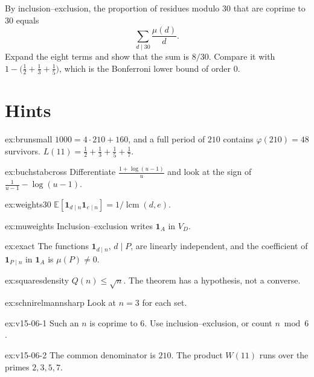 \begin{exercise}[$\star$]\label{ex:v15-06-4}
By inclusion--exclusion, the proportion of residues modulo \(30\) that are coprime to \(30\) equals
\[
\sum_{d\mid30}\frac{\mu(d)}d.
\]
Expand the eight terms and show that the sum is \(8/30\). Compare it with \(1-\bigl(\tfrac12+\tfrac13+\tfrac15\bigr)\), which is the Bonferroni lower bound of order \(0\).
\end{exercise}

\section{Hints}

\begin{hint}{ex:brunsmall}
$1000=4\cdot210+160$, and a full period of $210$ contains $\varphi(210)=48$ survivors. $L(11)=\frac12+\frac13+\frac15+\frac17$.
\end{hint}
\begin{hint}{ex:buchstabcross}
Differentiate $\frac{1+\log(u-1)}u$ and look at the sign of $\frac1{u-1}-\log(u-1)$.
\end{hint}
\begin{hint}{ex:weights30}
$\mathbb E[\mathbf 1_{d\mid n}\mathbf 1_{e\mid n}]=1/\operatorname{lcm}(d,e)$.
\end{hint}
\begin{hint}{ex:muweights}
Inclusion--exclusion writes $\mathbf 1_A$ in $V_D$.
\end{hint}
\begin{hint}{ex:exact}
The functions $\mathbf 1_{d\mid n}$, $d\mid P$, are linearly independent, and the coefficient of $\mathbf 1_{P\mid n}$ in $\mathbf 1_A$ is $\mu(P)\ne0$.
\end{hint}

\begin{hint}{ex:squaresdensity}
$Q(n)\le\sqrt n$. The theorem has a hypothesis, not a converse.
\end{hint}
\begin{hint}{ex:schnirelmannsharp}
Look at $n=3$ for each set.
\end{hint}

\begin{hint}{ex:v15-06-1}
Such an \(n\) is coprime to \(6\). Use inclusion--exclusion, or count \(n\bmod6\).
\end{hint}

\begin{hint}{ex:v15-06-2}
The common denominator is \(210\). The product \(W(11)\) runs over the primes \(2,3,5,7\).
\end{hint}

